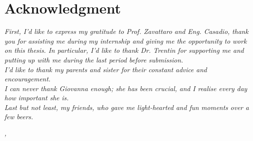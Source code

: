 \documentclass[../thesis.tex]{subfiles}
\begin{document}
    \cleardoublepage

    \bigskip

    \begingroup
    \let\clearpage\relax
    \let\cleardoublepage\relax
    \let\cleardoublepage\relax

    \chapter*{Acknowledgment}
    \noindent \textit{First, I'd like to express my gratitude to Prof. Zavattaro and Eng. Casadio, thank you for assisting me during my internship and giving me the opportunity to work on this thesis. In particular, I'd like to thank Dr. Trentin for supporting me and putting up with me during the last period before submission.}\\
    
    \noindent \textit{I'd like to thank my parents and sister for their constant advice and encouragement.}\\

    \noindent \textit{I can never thank Giovanna enough; she has been crucial, and I realise every day how important she is.}\\

    \noindent \textit{Last but not least, my friends, who gave me light-hearted and fun moments over a few beers.}\\
    \bigskip

    \noindent\textit{\myLocation, \myTime}
    \hfill \myName
    \endgroup
\end{document}

